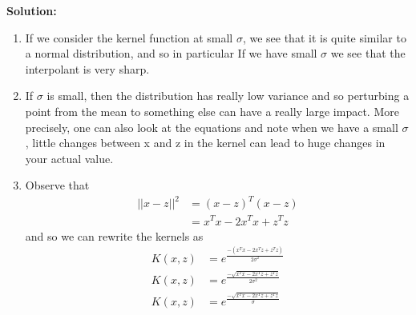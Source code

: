 \documentclass[11pt]{article}
\begin{document}
\textbf{Solution:}
\begin{enumerate}
    \item If we consider the kernel function at small $\sigma$, 
    we see that it is quite similar to a normal distribution, and so in particular If
    we have small $\sigma$ we see that the interpolant is very sharp.
    \item If $\sigma$ is small, then the distribution has really low variance and
    so perturbing a point from the mean to something else can have a really large impact.
    More precisely, one can also look at the equations and note when we have a small $\sigma$, 
     little changes between x and z in the kernel can lead to huge changes in your actual value.

    \item Observe that \begin{align*}
        ||x-z||^2 &= (x-z)^T(x-z) \\
        &= x^Tx -2x^Tx + z^Tz
    \end{align*} and so we can rewrite the kernels as \begin{align*}
        K(x,z) &= e^{\frac{-(x^Tx - 2x^Tz + z^Tz)}{2\sigma^2}} \\
        K(x,z) &= e^{\frac{-\sqrt{x^Tx - 2x^Tz + z^Tz}}{2\sigma^2}} \\
        K(x,z) &= e^{\frac{-\sqrt{x^Tx - 2x^Tz + z^Tz}}{\sigma}}
    \end{align*}


\end{enumerate}
\end{document}
